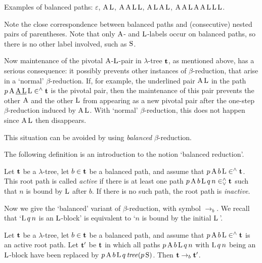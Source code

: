 \documentclass[submission,copyright,creativecommons]{eptcs}
\begin{document}
Examples of balanced paths: $\varepsilon$, ${\rm A} \, {\rm L}$, ${\rm A} \, {\rm A} \, {\rm L} \, {\rm L}$, ${\rm A} \, {\rm L} \, {\rm A} \, {\rm L}$, ${\rm A} \, {\rm A} \, {\rm L} \, {\rm A} \, {\rm A} \, {\rm L} \, {\rm L} \, {\rm L}$.


Note the close correspondence between balanced paths and (consecutive) nested pairs of parentheses. Note that only ${\rm A}$- and ${\rm L}$-labels occur on balanced paths, so there is no other label involved, such as ${\rm S}$.

\smallskip


Now maintenance of the pivotal ${\rm A}$-${\rm L}$-pair in $\lambda$-tree ${\bf t}$, as mentioned above, has a serious consequence: it possibly prevents other instances of $\beta$-reduction, that arise in a `normal' $\beta$-reduction. If, for example, the underlined pair \underline{${\rm A} \, {\rm L}$} in the path $p \, {\rm A} \, \underline{{\rm A} \, {\rm L}} \, {\rm L} \in^{\wedge} {\bf t}$ is the pivotal pair, then the maintenance of this pair prevents the other ${\rm A}$ and the other ${\rm L}$ from appearing as a new pivotal pair after the one-step $\beta$-reduction induced by \underline{${\rm A} \, {\rm L}$}. With `normal' $\beta$-reduction, this does not happen since \underline{${\rm A} \, {\rm L}$} then disappears.

This situation can be avoided by using {\em balanced\/} $\beta$-reduction.

The following definition is an introduction to the notion `balanced reduction'.

\begin{Def}\label{DefActBal}
Let ${\bf t}$ be a $\lambda$-tree, let $b \in {\bf t}$ be a balanced path, and assume that $p \, {\rm A} \, b \, {\rm L} \in^\wedge {\bf t}$. This root path is called {\em active\/} if there is at least one path $p \, {\rm A} \, b \, {\rm L} \, q \, n \in^{\wedge}_{\vee} {\bf t}$ such that $n$ is bound by ${\rm L}$ after $b$. If there is no such path, the root path is {\em inactive}.
\end{Def}

Now we give the `balanced' variant of $\beta$-reduction, with symbol $\rightarrow_b$. We recall that `${\rm L} \, q \, n$ is an ${\rm L}$-block' is equivalent to `$n$ is bound by the initial ${\rm L}$\,'.

\begin{Def}\label{DefBalRed}
Let ${\bf t}$ be a $\lambda$-tree, let $b \in {\bf t}$ be a balanced path, and assume that $p \, {\rm A} \, b \, {\rm L} \in^\wedge {\bf t}$ is an active root path.
Let ${\bf t}'$ be ${\bf t}$ in which all paths $p \, {\rm A} \, b \, {\rm L} \,
q \, n$ with ${\rm L} \, q \, n$ being an ${\rm L}$-block  have been
replaced by $p \, {\rm A} \, b \, {\rm L} \, q \, {\it tree}(p \, {\rm S})$.
Then ${\bf t} \rightarrow_b {\bf t}'$.
\end{Def}
\end{document}
